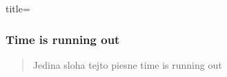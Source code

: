 \begin{song}{title=\subsubsection{Time is running out}}
\begin{verse}
Jedina sloha tejto piesne time is running out
\end{verse}
\end{song}